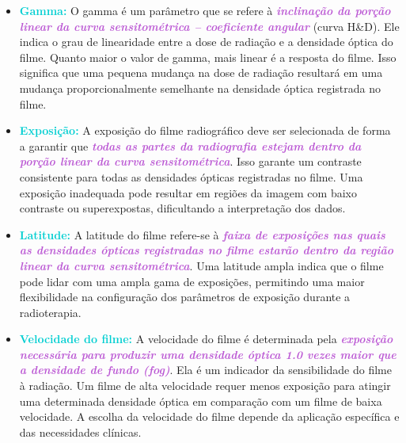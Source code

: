 \documentclass[11pt,a4paper]{article}
\newcounter{exemplo}
\begin{document}
	\begin{exemplo}
		\begin{itemize}
			\item \textcolor{DarkTurquoise}{\textbf{Gamma:}} O gamma é um parâmetro que se refere à \textcolor{MediumOrchid}{\textit{\textbf{inclinação da porção linear da curva sensitométrica -- coeficiente angular}}} (curva H\&D). Ele indica o grau de linearidade entre a dose de radiação e a densidade óptica do filme. Quanto maior o valor de gamma, mais linear é a resposta do filme. Isso significa que uma pequena mudança na dose de radiação resultará em uma mudança proporcionalmente semelhante na densidade óptica registrada no filme.
			\item \textcolor{DarkTurquoise}{\textbf{Exposição:}}  A exposição do filme radiográfico deve ser selecionada de forma a garantir que \textcolor{MediumOrchid}{\textit{\textbf{todas as partes da radiografia estejam dentro da porção linear da curva sensitométrica}}}. Isso garante um contraste consistente para todas as densidades ópticas registradas no filme. Uma exposição inadequada pode resultar em regiões da imagem com baixo contraste ou superexpostas, dificultando a interpretação dos dados.
			\item \textcolor{DarkTurquoise}{\textbf{Latitude:}} A latitude do filme refere-se à \textcolor{MediumOrchid}{\textit{\textbf{faixa de exposições nas quais as densidades ópticas registradas no filme estarão dentro da região linear da curva sensitométrica}}}. Uma latitude ampla indica que o filme pode lidar com uma ampla gama de exposições, permitindo uma maior flexibilidade na configuração dos parâmetros de exposição durante a radioterapia.
			\item \textcolor{DarkTurquoise}{\textbf{Velocidade do filme:}} A velocidade do filme é determinada pela \textcolor{MediumOrchid}{\textit{\textbf{exposição necessária para produzir uma densidade óptica 1.0 vezes maior que a densidade de fundo (fog)}}}. Ela é um indicador da sensibilidade do filme à radiação. Um filme de alta velocidade requer menos exposição para atingir uma determinada densidade óptica em comparação com um filme de baixa velocidade. A escolha da velocidade do filme depende da aplicação específica e das necessidades clínicas.
		\end{itemize}
	\end{exemplo}
\end{document}
